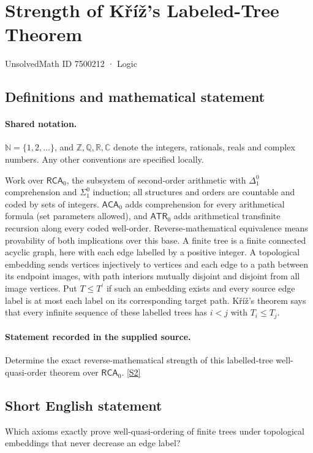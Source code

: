 \documentclass[11pt]{article}
\newcommand{\sref}[2]{\hyperlink{source:#1:#2}{[S#2]}}
\begin{document}
\setcounter{section}{7500211}
\section{Strength of Kříž's Labeled-Tree Theorem}\label{7500212}
{\small\sffamily UnsolvedMath ID 7500212 · Logic}
\subsection{Definitions and mathematical statement}

\paragraph{Shared notation.}$\mathbb N=\{1,2,\ldots\}$, and $\mathbb Z,\mathbb Q,\mathbb R,\mathbb C$ denote the integers, rationals, reals and complex numbers. Any other conventions are specified locally.


Work over $\mathsf{RCA}_0$, the subsystem of second-order arithmetic with $\Delta^0_1$ comprehension and $\Sigma^0_1$ induction; all structures and orders are countable and coded by sets of integers. $\mathsf{ACA}_0$ adds comprehension for every arithmetical formula (set parameters allowed), and $\mathsf{ATR}_0$ adds arithmetical transfinite recursion along every coded well-order. Reverse-mathematical equivalence means provability of both implications over this base. A finite tree is a finite connected acyclic graph, here with each edge labelled by a positive integer. A topological embedding sends vertices injectively to vertices and each edge to a path between its endpoint images, with path interiors mutually disjoint and disjoint from all image vertices. Put $T\le T^{\prime}$ if such an embedding exists and every source edge label is at most each label on its corresponding target path. Kříž's theorem says that every infinite sequence of these labelled trees has $i<j$ with $T_i\le T_j$.
\paragraph{Statement recorded in the supplied source.}
Determine the exact reverse-mathematical strength of this labelled-tree well-quasi-order theorem over $\mathsf{RCA}_0$. \sref{7500212}{2}
\subsection{Short English statement}
Which axioms exactly prove well-quasi-ordering of finite trees under topological embeddings that never decrease an edge label?
\end{document}
